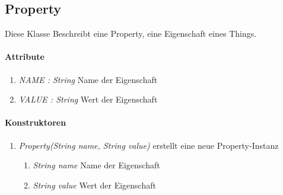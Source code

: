 \subsection*{Property}\label{prop}
Diese Klasse Beschreibt eine Property, eine Eigenschaft eines Things.

\paragraph{Attribute}
\begin{enumerate}[$\bullet$]
	\item \textit{NAME : String} Name der Eigenschaft
	\item \textit{VALUE : String} Wert der Eigenschaft
\end{enumerate}

\paragraph{Konstruktoren}
\begin{enumerate}[+]
	\item \textit{ Property(String name, String value)}
	erstellt eine neue Property-Instanz
	\begin{enumerate}[$\bullet$]
		\item \textit{String name} Name der Eigenschaft
		\item \textit{String value} Wert der Eigenschaft
	\end{enumerate}
	
\end{enumerate}
